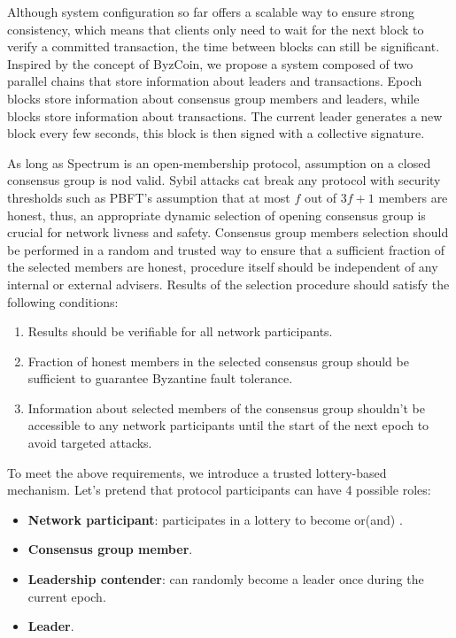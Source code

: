 Although system configuration so far offers a scalable way to ensure strong consistency, which means that clients only need to wait for the next block to verify a committed transaction, the time between blocks can still be significant.
Inspired by the concept of ByzCoin, we propose a system composed of two parallel chains that store information about leaders and transactions.
Epoch blocks store information about consensus group members and leaders, while blocks store information about transactions.
The current leader generates a new block every few seconds, this block is then signed with a collective signature.

As long as Spectrum is an open-membership protocol, assumption on a closed consensus group is nod valid.
Sybil attacks cat break any protocol with security thresholds such as PBFT's assumption that at most $f$ out of ${3 f + 1}$ members are honest, thus, an appropriate dynamic selection of opening consensus group is crucial for network livness and safety.
Consensus group members selection should be performed in a random and trusted way to ensure that a sufficient fraction of the selected members are honest, procedure itself should be independent of any internal or external advisers.
Results of the selection procedure should satisfy the following conditions:
\begin{enumerate}
    \item Results should be verifiable for all network participants.
    \item Fraction of honest members in the selected consensus group should be sufficient to guarantee Byzantine fault tolerance.
    \item Information about selected members of the consensus group shouldn't be accessible to any network participants until the start of the next epoch to avoid targeted attacks.
\end{enumerate}

To meet the above requirements, we introduce a trusted lottery-based mechanism.
Let's pretend that protocol participants can have 4 possible roles:
\begin{itemize}
    \item \textbf{Network participant}: participates in a lottery to become  or(and) .
    \item \textbf{Consensus group member}.
    \item \textbf{Leadership contender}: can randomly become a leader once during the current epoch.
    \item \textbf{Leader}.
\end{itemize}


